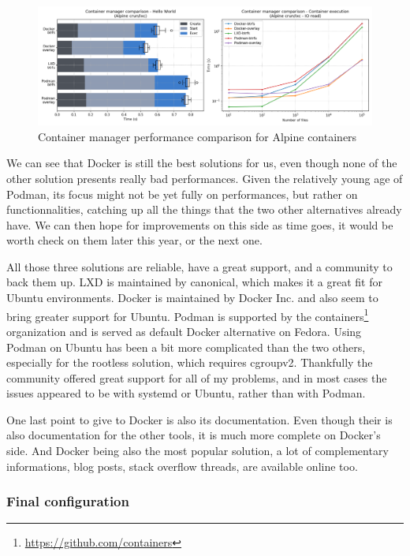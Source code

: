 \begin{figure}[h!]
  \begin{center}
    \includegraphics[width=\linewidth]{images/question-1-manager.png}
    \caption{Container manager performance comparison for Alpine containers}
    \label{fig:q1:manager}
  \end{center}
\end{figure}

We can see that Docker is still the best solutions for us, even though none of the other solution presents really bad performances.  Given the relatively young age of Podman, its focus might not be yet fully on performances, but rather on functionnalities, catching up all the things that the two other alternatives already have.  We can then hope for improvements on this side as time goes, it would be worth check on them later this year, or the next one.  

All those three solutions are reliable, have a great support, and a community to back them up.  LXD is maintained by canonical, which makes it a great fit for Ubuntu environments.  Docker is maintained by Docker Inc. and also seem to bring greater support for Ubuntu.  Podman is supported by the containers\footnote{\href{https://github.com/containers}{https://github.com/containers}} organization and is served as default Docker alternative on Fedora.  Using Podman on Ubuntu has been a bit more complicated than the two others, especially for the rootless solution, which requires cgroupv2.  Thankfully the community offered great support for all of my problems, and in most cases the issues appeared to be with systemd or Ubuntu, rather than with Podman.

One last point to give to Docker is also its documentation.  Even though their is also documentation for the other tools, it is much more complete on Docker's side.  And Docker being also the most popular solution, a lot of complementary informations, blog posts, stack overflow threads, are available online too.

\subsubsection{Final configuration}

